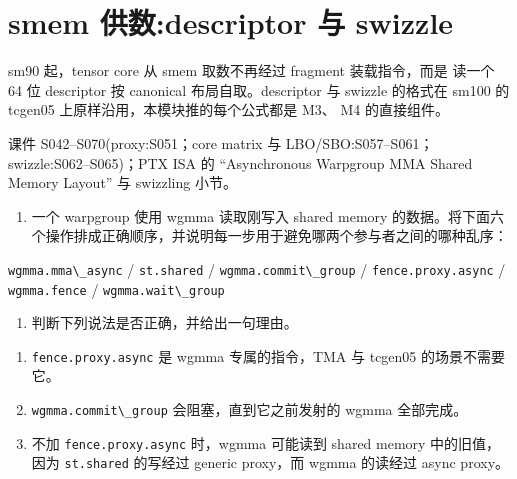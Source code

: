\documentclass[11pt,a4paper,fontset=none]{ctexart}
\providecommand{\tightlist}{\setlength{\itemsep}{0pt}\setlength{\parskip}{0pt}}
\providecommand{\passthrough}[1]{#1}
\begin{document}
\hypertarget{smem-ux4f9bux6570descriptor-ux4e0e-swizzle}{%
\section{smem 供数:descriptor 与
swizzle}\label{smem-ux4f9bux6570descriptor-ux4e0e-swizzle}}

sm90 起，tensor core 从 smem 取数不再经过 fragment 装载指令，而是 读一个
64 位 descriptor 按 canonical 布局自取。descriptor 与 swizzle 的格式在
sm100 的 tcgen05 上原样沿用，本模块推的每个公式都是 M3、 M4 的直接组件。

\begin{reading}

课件 S042--S070(proxy:S051；core matrix 与 LBO/SBO:S057--S061；
swizzle:S062--S065)；PTX ISA 的 ``Asynchronous Warpgroup MMA Shared
Memory Layout'' 与 swizzling 小节。

\end{reading}


\begin{enumerate}
\def\labelenumi{(\alph{enumi})}
\tightlist
\item
  一个 warpgroup 使用 wgmma 读取刚写入 shared memory
  的数据。将下面六个操作排成正确顺序，并说明每一步用于避免哪两个参与者之间的哪种乱序：
\end{enumerate}

\passthrough{\lstinline!wgmma.mma\_async!} /
\passthrough{\lstinline!st.shared!} /
\passthrough{\lstinline!wgmma.commit\_group!} /
\passthrough{\lstinline!fence.proxy.async!} /
\passthrough{\lstinline!wgmma.fence!} /
\passthrough{\lstinline!wgmma.wait\_group!}

\begin{enumerate}
\def\labelenumi{(\alph{enumi})}
\setcounter{enumi}{1}
\tightlist
\item
  判断下列说法是否正确，并给出一句理由。
\end{enumerate}

\begin{enumerate}
\def\labelenumi{\arabic{enumi}.}
\tightlist
\item
  \passthrough{\lstinline!fence.proxy.async!} 是 wgmma 专属的指令，TMA
  与 tcgen05 的场景不需要它。
\item
  \passthrough{\lstinline!wgmma.commit\_group!} 会阻塞，直到它之前发射的
  wgmma 全部完成。
\item
  不加 \passthrough{\lstinline!fence.proxy.async!} 时，wgmma 可能读到
  shared memory 中的旧值，因为 \passthrough{\lstinline!st.shared!}
  的写经过 generic proxy，而 wgmma 的读经过 async proxy。
\end{enumerate}
\end{document}
